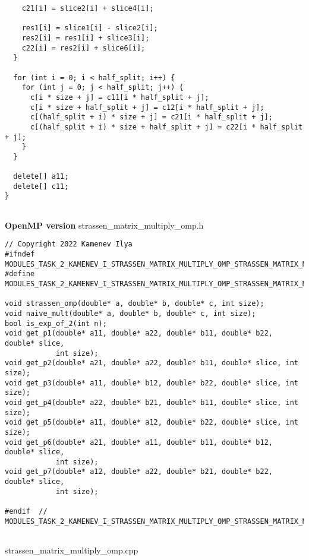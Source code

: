 \documentclass{report}
\begin{document}
\begin{lstlisting}
    c21[i] = slice2[i] + slice4[i];

    res1[i] = slice1[i] - slice2[i];
    res2[i] = res1[i] + slice3[i];
    c22[i] = res2[i] + slice6[i];
  }

  for (int i = 0; i < half_split; i++) {
    for (int j = 0; j < half_split; j++) {
      c[i * size + j] = c11[i * half_split + j];
      c[i * size + half_split + j] = c12[i * half_split + j];
      c[(half_split + i) * size + j] = c21[i * half_split + j];
      c[(half_split + i) * size + half_split + j] = c22[i * half_split + j];
    }
  }

  delete[] a11;
  delete[] c11;
}


\end{lstlisting}

\textbf{OpenMP version}
\newline
\newline strassen\_matrix\_multiply\_omp.h
\begin{lstlisting}
// Copyright 2022 Kamenev Ilya
#ifndef MODULES_TASK_2_KAMENEV_I_STRASSEN_MATRIX_MULTIPLY_OMP_STRASSEN_MATRIX_MULTIPLY_OMP_H_
#define MODULES_TASK_2_KAMENEV_I_STRASSEN_MATRIX_MULTIPLY_OMP_STRASSEN_MATRIX_MULTIPLY_OMP_H_

void strassen_omp(double* a, double* b, double* c, int size);
void naive_mult(double* a, double* b, double* c, int size);
bool is_exp_of_2(int n);
void get_p1(double* a11, double* a22, double* b11, double* b22, double* slice,
            int size);
void get_p2(double* a21, double* a22, double* b11, double* slice, int size);
void get_p3(double* a11, double* b12, double* b22, double* slice, int size);
void get_p4(double* a22, double* b21, double* b11, double* slice, int size);
void get_p5(double* a11, double* a12, double* b22, double* slice, int size);
void get_p6(double* a21, double* a11, double* b11, double* b12, double* slice,
            int size);
void get_p7(double* a12, double* a22, double* b21, double* b22, double* slice,
            int size);

#endif  // MODULES_TASK_2_KAMENEV_I_STRASSEN_MATRIX_MULTIPLY_OMP_STRASSEN_MATRIX_MULTIPLY_OMP_H_


\end{lstlisting}
strassen\_matrix\_multiply\_omp.cpp
\end{document}
